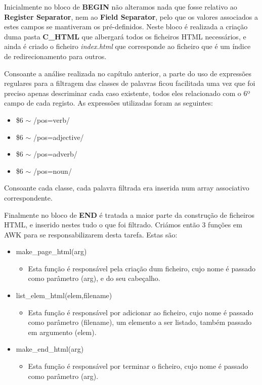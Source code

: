 \documentclass[11pt,a4paper]{report}
\begin{document}
Inicialmente no bloco de \textbf{BEGIN} não alteramos nada que fosse relativo ao \textbf{Register Separator}, nem ao \textbf{Field Separator}, pelo que os valores associados a estes campos se mantiveram os pré-definidos. Neste bloco é realizada a criação duma pasta \textbf{C\_HTML} que albergará todos os ficheiros HTML necessários, e ainda é criado o ficheiro \textit{index.html} que corresponde ao ficheiro que é um índice de redirecionamento para outros.

Consoante a análise realizada no capítulo anterior, a parte do uso de expressões regulares para a filtragem das classes de palavras ficou facilitada uma vez que foi preciso apenas descriminar cada caso existente, todos eles relacionado com o 6º campo de cada registo. As expressões utilizadas foram as seguintes:

\begin{itemize}
	\item \$6 $\sim$ /pos=verb/
	\item \$6 $\sim$ /pos=adjective/
	\item \$6 $\sim$ /pos=adverb/
	\item \$6 $\sim$ /pos=noun/
\end{itemize}

Consoante cada classe, cada palavra filtrada era inserida num array associativo correspondente.

Finalmente no bloco de \textbf{END} é tratada a maior parte da construção de ficheiros HTML, e inserido nestes tudo o que foi filtrado. Criámos então 3 funções em AWK para se responsabilizarem desta tarefa. Estas são:

\begin{itemize}
	\item make\_page\_html(arg)
	\begin{itemize}
		\item Esta função é responsável pela criação dum ficheiro, cujo nome é passado como parâmetro (arg), e do seu cabeçalho.
	\end{itemize}
	\item list\_elem\_html(elem,filename)
	\begin{itemize}
		\item Esta função é responsável por adicionar ao ficheiro, cujo nome é passado como parâmetro (filename), um elemento a ser listado, também passado em argumento (elem).
	\end{itemize}
	\item make\_end\_html(arg)
	\begin{itemize}
		\item Esta função é responsável por terminar o ficheiro, cujo nome é passado como parâmetro (arg).
	\end{itemize}
\end{itemize}
\end{document}

